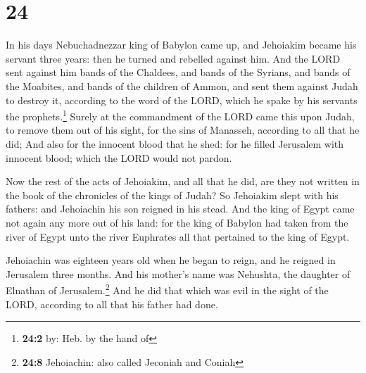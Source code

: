 \hypertarget{section-23}{%
\section{24}\label{section-23}}

 In his days Nebuchadnezzar king of Babylon came up, and
Jehoiakim became his servant three years: then he turned and rebelled
against him.  And the LORD sent against him bands of the
Chaldees, and bands of the Syrians, and bands of the Moabites, and bands
of the children of Ammon, and sent them against Judah to destroy it,
according to the word of the LORD, which he spake by his servants the
prophets.\footnote{\textbf{24:2} by: Heb. by the hand of} 
Surely at the commandment of the LORD came this upon Judah, to remove
them out of his sight, for the sins of Manasseh, according to all that
he did;  And also for the innocent blood that he shed: for
he filled Jerusalem with innocent blood; which the LORD would not
pardon.

 Now the rest of the acts of Jehoiakim, and all that he
did, are they not written in the book of the chronicles of the kings of
Judah?  So Jehoiakim slept with his fathers: and
Jehoiachin his son reigned in his stead.  And the king of
Egypt came not again any more out of his land: for the king of Babylon
had taken from the river of Egypt unto the river Euphrates all that
pertained to the king of Egypt.

 Jehoiachin was eighteen years old when he began to reign,
and he reigned in Jerusalem three months. And his mother's name was
Nehushta, the daughter of Elnathan of Jerusalem.\footnote{\textbf{24:8}
  Jehoiachin: also called Jeconiah and Coniah}  And he did
that which was evil in the sight of the LORD, according to all that his
father had done.

